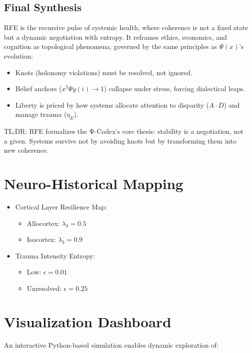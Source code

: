 \documentclass[11pt]{article}
\begin{document}
\subsection*{Final Synthesis}
RFE is the recursive pulse of systemic health, where coherence is not a fixed state but a dynamic negotiation with entropy. It reframes ethics, economics, and cognition as topological phenomena, governed by the same principles as \(\Psi(x)\)’s evolution:
\begin{itemize}
    \item Knots (holonomy violations) must be resolved, not ignored.
    \item Belief anchors (\(x^5 \Psi y(i) \to 1\)) collapse under stress, forcing dialectical leaps.
    \item Liberty is priced by how systems allocate attention to disparity (\(A \cdot D\)) and manage trauma (\(\eta_E\)).
\end{itemize}
TL;DR: RFE formalizes the Ψ-Codex’s core thesis: stability is a negotiation, not a given. Systems survive not by avoiding knots but by transforming them into new coherence.

\section{Neuro-Historical Mapping}

\begin{itemize}
  \item Cortical Layer Resilience Map:
    \begin{itemize}
      \item Allocortex: \( \lambda_3 = 0.5 \)
      \item Isocortex: \( \lambda_3 = 0.9 \)
    \end{itemize}
  \item Trauma Intensity Entropy:
    \begin{itemize}
      \item Low: \( \epsilon = 0.01 \)
      \item Unresolved: \( \epsilon = 0.25 \)
    \end{itemize}
\end{itemize}

\section{Visualization Dashboard}

An interactive Python-based simulation enables dynamic exploration of:
\end{document}
